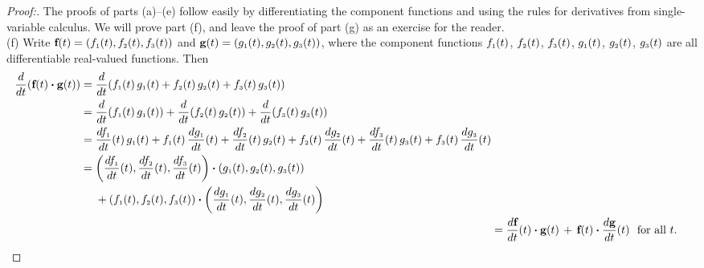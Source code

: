 \begin{proofbar}\vspace{-3mm}\begin{proof}[Proof:]
 The proofs of parts (a)--(e) follow easily by differentiating the component functions and using the rules for derivatives from single-variable calculus. 
 We will prove part (f), and leave the proof of part (g) as an exercise for
 the reader.\vspace{1mm}\\(f)
 Write $\textbf{f}(t) = ( f_{\scriptscriptstyle 1}(t),f_{\scriptscriptstyle 2}(t),f_{\scriptscriptstyle 3}(t) )$ and
 $\textbf{g}(t) = ( g_{\scriptscriptstyle 1}(t),g_{\scriptscriptstyle 2}(t),g_{\scriptscriptstyle 3}(t) )$, where the component functions
 $f_{\scriptscriptstyle 1}(t)$, $f_{\scriptscriptstyle 2}(t)$, $f_{\scriptscriptstyle 3}(t)$, $g_{\scriptscriptstyle 1}(t)$, $g_{\scriptscriptstyle 2}(t)$, $g_{\scriptscriptstyle 3}(t)$ are all
 differentiable real-valued functions. Then
 \begin{align*}\begin{split}
  \dfrac{d}{dt} ( \textbf{f}(t) \bm{\cdot} \textbf{g}(t) ) &= \dfrac{d}{dt} ( f_{\scriptscriptstyle 1}(t)\,g_{\scriptscriptstyle 1}(t) +
   f_{\scriptscriptstyle 2}(t)\,g_{\scriptscriptstyle 2}(t) + f_{\scriptscriptstyle 3}(t)\,g_{\scriptscriptstyle 3}(t) )\\
  &= \dfrac{d}{dt} ( f_{\scriptscriptstyle 1}(t)\,g_{\scriptscriptstyle 1}(t) ) +
   \dfrac{d}{dt} ( f_{\scriptscriptstyle 2}(t)\,g_{\scriptscriptstyle 2}(t) ) + \dfrac{d}{dt} ( f_{\scriptscriptstyle 3}(t)\,g_{\scriptscriptstyle 3}(t) )\\
  &= \dfrac{df_{\scriptscriptstyle 1}}{dt}(t)\,g_{\scriptscriptstyle 1}(t) + f_{\scriptscriptstyle 1}(t)\,\dfrac{dg_{\scriptscriptstyle 1}}{dt}(t) +
   \dfrac{df_{\scriptscriptstyle 2}}{dt}(t)\,g_{\scriptscriptstyle 2}(t) + f_{\scriptscriptstyle 2}(t)\,\dfrac{dg_{\scriptscriptstyle 2}}{dt}(t) +
   \dfrac{df_{\scriptscriptstyle 3}}{dt}(t)\,g_{\scriptscriptstyle 3}(t) + f_{\scriptscriptstyle 3}(t)\,\dfrac{dg_{\scriptscriptstyle 3}}{dt}(t)\\
  &= \biggl( \dfrac{df_{\scriptscriptstyle 1}}{dt}(t),\dfrac{df_{\scriptscriptstyle 2}}{dt}(t),\dfrac{df_{\scriptscriptstyle 3}}{dt}(t) \biggr) \bm{\cdot} 
   ( g_{\scriptscriptstyle 1}(t),g_{\scriptscriptstyle 2}(t),g_{\scriptscriptstyle 3}(t) )\\
   &\mathrel{\phantom{=}} {} + ( f_{\scriptscriptstyle 1}(t),f_{\scriptscriptstyle 2}(t),f_{\scriptscriptstyle 3}(t) ) \bm{\cdot} 
   \biggl( \dfrac{dg_{\scriptscriptstyle 1}}{dt}(t),\dfrac{dg_{\scriptscriptstyle 2}}{dt}(t),\dfrac{dg_{\scriptscriptstyle 3}}{dt}(t) \biggr)\end{split}\\
  &= \dfrac{d\textbf{f}}{dt}(t) \bm{\cdot} \textbf{g}(t) \,+\, \textbf{f}(t) \bm{\cdot} \dfrac{d\textbf{g}}{dt}(t)
   \text{~~for all $t$.} \qedhere
 \end{align*}
\end{proof}\vspace{-3mm}\end{proofbar}

